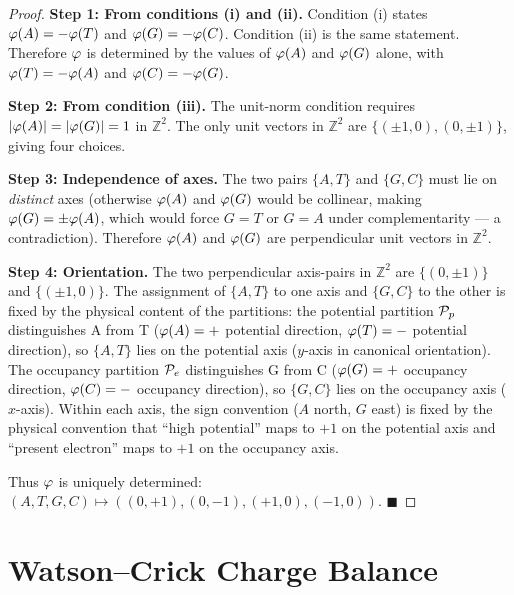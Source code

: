 \begin{proof}
\textbf{Step 1: From conditions (i) and (ii).}
Condition (i) states $\varphi(A) = -\varphi(T)$ and
$\varphi(G) = -\varphi(C)$. Condition (ii) is the same statement.
Therefore $\varphi$ is determined by the values of $\varphi(A)$ and
$\varphi(G)$ alone, with $\varphi(T) = -\varphi(A)$ and
$\varphi(C) = -\varphi(G)$.

\textbf{Step 2: From condition (iii).}
The unit-norm condition requires $|\varphi(A)| = |\varphi(G)| = 1$
in $\mathbb{Z}^2$. The only unit vectors in $\mathbb{Z}^2$ are
$\{(\pm 1, 0), (0, \pm 1)\}$, giving four choices.

\textbf{Step 3: Independence of axes.}
The two pairs $\{A,T\}$ and $\{G,C\}$ must lie on \emph{distinct} axes
(otherwise $\varphi(A)$ and $\varphi(G)$ would be collinear, making
$\varphi(G) = \pm\varphi(A)$, which would force $G = T$ or $G = A$
under complementarity --- a contradiction). Therefore $\varphi(A)$ and
$\varphi(G)$ are perpendicular unit vectors in $\mathbb{Z}^2$.

\textbf{Step 4: Orientation.}
The two perpendicular axis-pairs in $\mathbb{Z}^2$ are $\{(0,\pm 1)\}$
and $\{(\pm 1,0)\}$. The assignment of $\{A,T\}$ to one axis and
$\{G,C\}$ to the other is fixed by the physical content of the partitions:
the potential partition $\mathcal{P}_p$ distinguishes A from T
($\varphi(A) = +$ potential direction, $\varphi(T) = -$ potential
direction), so $\{A,T\}$ lies on the potential axis ($y$-axis in canonical
orientation). The occupancy partition $\mathcal{P}_e$ distinguishes G from C
($\varphi(G) = +$ occupancy direction, $\varphi(C) = -$ occupancy
direction), so $\{G,C\}$ lies on the occupancy axis ($x$-axis).
Within each axis, the sign convention ($A$ north, $G$ east) is fixed
by the physical convention that ``high potential'' maps to $+1$ on
the potential axis and ``present electron'' maps to $+1$ on the
occupancy axis.

Thus $\varphi$ is uniquely determined:
$(A,T,G,C) \mapsto ((0,+1),(0,-1),(+1,0),(-1,0))$. $\blacksquare$
\end{proof}

\section{Watson--Crick Charge Balance}
\label{sec:charge_balance}

